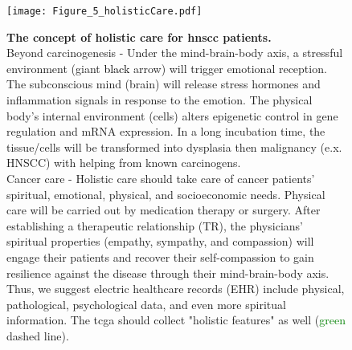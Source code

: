 \documentclass[jpm,article,submit,moreauthors,pdftex]{Definitions/mdpi}
\newcommand{\bcaption}[2]{\caption{\textbf{#1} #2}}
\begin{document}
\begin{paracol}{2}
\begin{figure}[hp]
\centering
\texttt{[image: Figure\_5\_holisticCare.pdf]}
\bcaption{The concept of holistic care for \acrshort{hnscc} patients.}
{\\Beyond carcinogenesis - Under the mind-brain-body axis, a stressful environment (giant \textcolor{black}{black} arrow) will trigger emotional reception. The subconscious mind (brain) will release stress hormones and inflammation signals in response to the emotion. The physical body's internal environment (cells) alters epigenetic control in gene regulation and mRNA expression. In a long incubation time, the tissue/cells will be transformed into dysplasia then malignancy (e.x. HNSCC) with helping from known carcinogens.\\
Cancer care - Holistic care should take care of cancer patients' spiritual, emotional, physical, and socioeconomic needs. Physical care will be carried out by medication therapy or surgery. After establishing a therapeutic relationship (TR), the physicians' spiritual properties (empathy, sympathy, and compassion) will engage their patients and recover their self-compassion to gain resilience against the disease through their mind-brain-body axis.
Thus, we suggest electric healthcare records (EHR) include physical, pathological, psychological data, and even more spiritual information. The \acrshort{tcga} should collect "holistic features" as well (\textcolor{green}{green} dashed line).}
\label{fig:figure5}
\end{figure}



\end{paracol}
\end{document}
